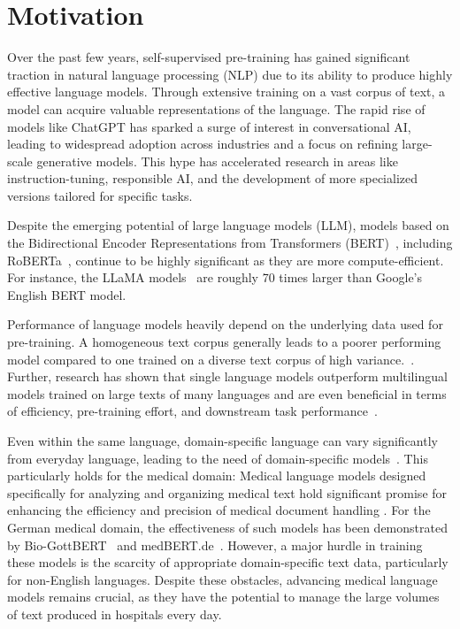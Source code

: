 \chapter*{Motivation}\label{chapter:motivation}

Over the past few years, self-supervised pre-training has gained significant
traction in natural language processing (NLP) due to its ability to produce
highly effective language models. Through extensive training on a vast corpus of
text, a model can acquire valuable representations of the language. The rapid
rise of models like ChatGPT has sparked a surge of interest in conversational
AI, leading to widespread adoption across industries and a focus on refining
large-scale generative models. This hype has accelerated research in areas like
instruction-tuning, responsible AI, and the development of more specialized
versions tailored for specific tasks.

Despite the emerging potential of large language models (LLM), models based on
the Bidirectional Encoder Representations from Transformers
(BERT)~\cite{devlin2019bert}, including RoBERTa~\cite{liu2019roberta}, continue
to be highly significant as they are more compute-efficient. For instance, the
LLaMA models~\cite{touvron2023llama1, touvron2023llama2} are roughly 70 times
larger than Google's English BERT model. 

Performance of language models heavily depend on the underlying data used for
pre-training. A homogeneous text corpus generally leads to a poorer performing
model compared to one trained on a diverse text corpus of high
variance.~\cite{martin2020camembert}. Further, research has shown that single
language models outperform multilingual models trained on large texts of many
languages and are even beneficial in terms of efficiency, pre-training effort,
and downstream task performance~\cite{scheible2020gottbert, chan2020german,
martin2020camembert}.

Even within the same language, domain-specific language can vary significantly
from everyday language, leading to the need of domain-specific
models~\cite{arefeva2022tourbert}. This particularly holds for the medical
domain: Medical language models designed specifically for analyzing and
organizing medical text hold significant promise for enhancing the efficiency
and precision of medical document handling \cite{beltagy2019scibert,
huang2019clinicalbert, peng2019transfer, lee2020biobert}. For the German medical
domain, the effectiveness of such models has been demonstrated by
Bio-GottBERT~\cite{lentzen2022critical} and
medBERT.de~\cite{bressem2024medbert}. However, a major hurdle in training these
models is the scarcity of appropriate domain-specific text data, particularly
for non-English languages. Despite these obstacles, advancing medical language
models remains crucial, as they have the potential to manage the large volumes
of text produced in hospitals every day.


